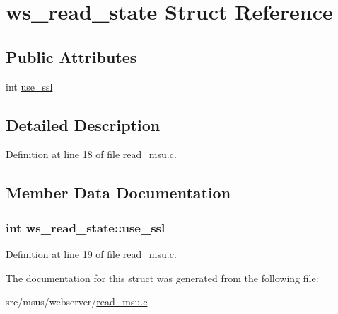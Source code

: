 \hypertarget{structws__read__state}{\section{ws\-\_\-read\-\_\-state Struct Reference}
\label{structws__read__state}
}
\subsection*{Public Attributes}
\begin{DoxyCompactItemize}
\item 
int \hyperlink{structws__read__state_a7205cee380e1d033b8b56aa01bfbad81}{use\-\_\-ssl}
\end{DoxyCompactItemize}


\subsection{Detailed Description}


Definition at line 18 of file read\-\_\-msu.\-c.



\subsection{Member Data Documentation}
\hypertarget{structws__read__state_a7205cee380e1d033b8b56aa01bfbad81}{
\subsubsection[{use\-\_\-ssl}]{\setlength{\rightskip}{0pt plus 5cm}int ws\-\_\-read\-\_\-state\-::use\-\_\-ssl}}\label{structws__read__state_a7205cee380e1d033b8b56aa01bfbad81}


Definition at line 19 of file read\-\_\-msu.\-c.



The documentation for this struct was generated from the following file\-:\begin{DoxyCompactItemize}
\item 
src/msus/webserver/\hyperlink{read__msu_8c}{read\-\_\-msu.\-c}\end{DoxyCompactItemize}
